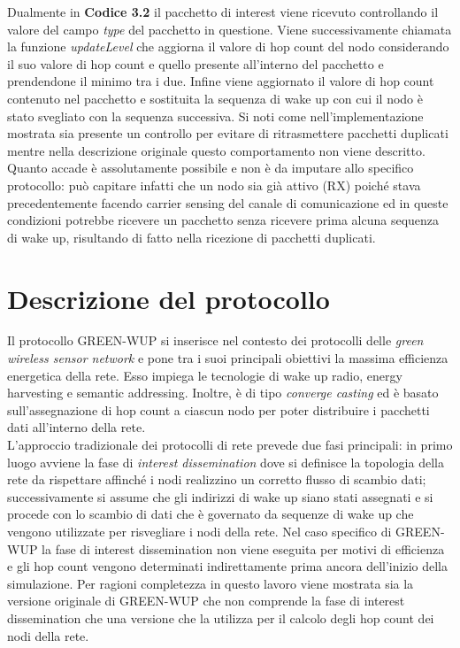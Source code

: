 \documentclass[binding=0.6cm,TFA]{sapthesis}
\begin{document}
Dualmente in \textbf{Codice 3.2} il pacchetto di interest viene ricevuto controllando il valore del campo \emph{type} del pacchetto in questione. Viene
successivamente chiamata la funzione \emph{updateLevel} che aggiorna il valore di hop count del nodo considerando il suo valore di hop count
e quello presente all'interno del pacchetto e prendendone il minimo tra i due. Infine viene aggiornato il valore di hop count contenuto
nel pacchetto e sostituita la sequenza di wake up con cui il nodo è stato svegliato con la sequenza successiva. Si noti come 
nell'implementazione mostrata sia presente un controllo per evitare di ritrasmettere pacchetti duplicati mentre nella descrizione originale
questo comportamento non viene descritto. Quanto accade è assolutamente possibile e non è da imputare allo specifico protocollo: può capitare infatti
che un nodo sia già attivo (RX) poiché stava precedentemente facendo carrier sensing del canale di comunicazione ed in queste condizioni
potrebbe ricevere un pacchetto senza ricevere prima alcuna sequenza di wake up, risultando di fatto nella ricezione di pacchetti duplicati.

\let\cleardoublepage\clearpage  %

\section{Descrizione del protocollo}

Il protocollo GREEN-WUP si inserisce nel contesto dei protocolli delle \emph{green wireless sensor network} e pone tra i suoi principali obiettivi
la massima efficienza energetica della rete. Esso impiega le tecnologie di wake up radio, energy harvesting e semantic addressing. Inoltre, è
di tipo \emph{converge casting} ed è basato sull'assegnazione di hop count a ciascun nodo per poter distribuire i pacchetti dati
all'interno della rete.\\

L'approccio tradizionale dei protocolli di rete prevede due fasi principali: in primo luogo avviene la fase di \emph{interest dissemination} dove si
definisce la topologia della rete da rispettare affinché i nodi realizzino un corretto flusso di scambio dati; successivamente si assume che gli
indirizzi di wake up siano stati assegnati e si procede con lo scambio di dati che è governato da sequenze di wake up che vengono utilizzate per
risvegliare i nodi della rete. Nel caso specifico di GREEN-WUP la fase di interest dissemination non viene eseguita per motivi di efficienza
e gli hop count vengono determinati indirettamente prima ancora dell'inizio della simulazione. Per ragioni completezza in questo lavoro viene
mostrata sia la versione originale di GREEN-WUP che non comprende la fase di interest dissemination che una versione che la utilizza per
il calcolo degli hop count dei nodi della rete.\\
\end{document}
